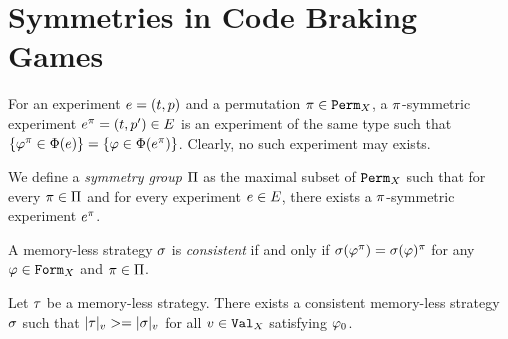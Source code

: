 \section{Symmetries in Code Braking Games}



\begin{definition}
For an experiment $e = (t, p)$ and a permutation $\pi\in\mathtt{Perm}_X$,
  a $\pi$-symmetric experiment $e^\pi = (t, p')\in E$
  is an experiment of the same type such that
  $\{\varphi^\pi \in\Phi(e)\} = \{\varphi\in\Phi(e^\pi)\}$.
Clearly, no such experiment may exists.
\end{definition}

\begin{definition}
We define a \emph{symmetry group} $\Pi$ as
  the maximal subset of $\mathtt{Perm}_X$ such that for
  every $\pi\in\Pi$ and for every experiment $e\in E$,
  there exists a $\pi$-symmetric experiment $e^\pi$.
\end{definition}

\begin{definition}
A memory-less strategy $\sigma$ is \emph{consistent} if and only if
  $\sigma(\varphi^\pi) = \sigma(\varphi)^\pi$ for any $\varphi\in\mathtt{Form}_X$ and
  $\pi\in\Pi$.
\end{definition}

\begin{lemma}
Let $\tau$ be a memory-less strategy.
There exists a consistent memory-less strategy $\sigma$ such that
  $|\tau|_{v} >= |\sigma|_{v}$ for all $v\in\mathtt{Val}_X$ satisfying $\varphi_0$.
\end{lemma}

